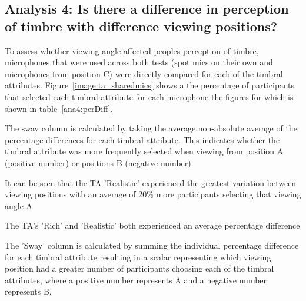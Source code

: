 















\subsection{Analysis 4: Is there a difference in perception of timbre with difference viewing positions?}
	
	To assess whether viewing angle affected peoples perception of timbre, microphones that were used across both tests (spot mics on their own and microphones from position C) were directly compared for each of the timbral attributes. Figure~\ref{image:ta_sharedmics} shows a the percentage of participants that selected each timbral attribute for each microphone the figures for which is shown in table~\ref{ana4:perDiff}.

	The sway column is calculated by taking the average non-absolute average of the percentage differences for each timbral attribute. This indicates whether the timbral attribute was more frequently selected when viewing from position A (positive number) or positions B (negative number).

	It can be seen that the TA 'Realistic' experienced the greatest variation between viewing positions with an average of 20\% more participants selecting that viewing angle A 

	The TA's 'Rich' and 'Realistic' both experienced an average percentage difference 



	The 'Sway' column is calculated by summing the individual percentage difference for each timbral attribute resulting in a scalar representing which viewing position had a greater number of participants choosing each of the timbral attributes, where a positive number represents A and a negative number represents B.



